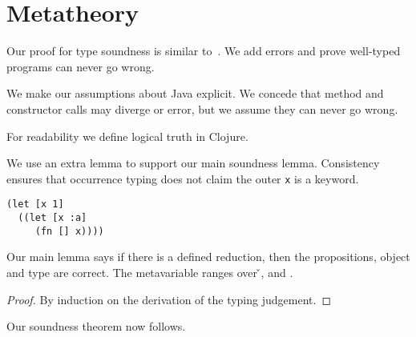 \section{Metatheory}

Our proof for type soundness is similar to~\cite{TF10}. We add
errors and prove well-typed programs can never go wrong.

We make our assumptions about Java explicit. We concede that
method and constructor calls may diverge or error, but we assume they can
never go wrong.

{\javaassumptionsall}

For readability we define logical truth in Clojure.

{\istruefalsedefinitions}

We use an extra lemma to support our main soundness lemma. Consistency
ensures that occurrence typing does not claim the outer 
\texttt{x} is a keyword. 

\begin{verbatim}
(let [x 1]
  ((let [x :a]
     (fn [] x))))
\end{verbatim}

{\consistentwithdefinition}

Our main lemma says if there is a defined reduction, then the propositions, object
and type are correct.
The metavariable  ranges over \v{}, \errorvalv{} and \wrong{}.

\begin{lemma}\label{lemma:soundness}

  {\soundnesslemmahypothesis}
  \begin{proof}
    By induction on the derivation of the typing judgement.
  \end{proof}
\end{lemma}


Our soundness theorem now follows.

{\soundnesstheorem}

{\wrongtheorem}

{\nilinvoketheorem}

